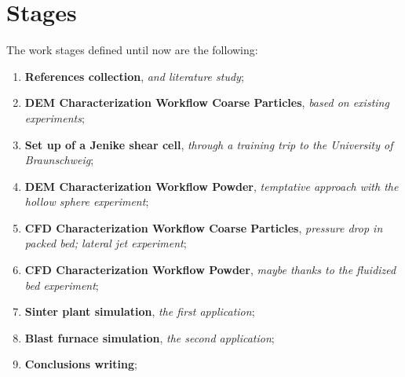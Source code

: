 
\section{Stages}
\label{section:stages}

The work stages defined until now are the following:

\begin{enumerate}
\item{\textbf{References collection}, \textit{and literature study};}
\item{\textbf{DEM Characterization Workflow Coarse Particles}, \textit{based on existing experiments};}
\item{\textbf{Set up of a Jenike shear cell}, \textit{through a training trip to the University of Braunschweig};}
\item{\textbf{DEM Characterization Workflow Powder}, \textit{temptative approach with the hollow sphere experiment};}
\item{\textbf{CFD Characterization Workflow Coarse Particles}, \textit{pressure drop in packed bed; lateral jet experiment};}
\item{\textbf{CFD Characterization Workflow Powder}, \textit{maybe thanks to the fluidized bed experiment};}
\item{\textbf{Sinter plant simulation}, \textit{the first application};}
\item{\textbf{Blast furnace simulation}, \textit{the second application};}
\item{\textbf{Conclusions writing};}
\end{enumerate}

